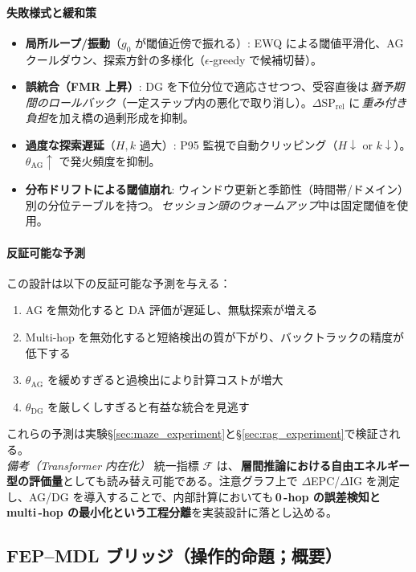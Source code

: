 \documentclass[ja=standard,xelatex]{bxjsarticle}
\newcommand{\F}{\mathcal{F}}
\begin{document}
\paragraph{失敗様式と緩和策}\label{sec:failure_modes}
\begin{itemize}[leftmargin=*]
  \item \textbf{局所ループ/振動}（$g_0$ が閾値近傍で振れる）: EWQ による閾値平滑化、AG クールダウン、探索方針の多様化（$\epsilon$-greedy で候補切替）。
  \item \textbf{誤統合（FMR 上昇）}: DG を下位分位で適応させつつ、受容直後は\,\emph{猶予期間のロールバック}（一定ステップ内の悪化で取り消し）。$\Delta\mathrm{SP}_{\mathrm{rel}}$ に\,\emph{重み付き負担}を加え橋の過剰形成を抑制。
  \item \textbf{過度な探索遅延}（$H, k$ 過大）: P95 監視で自動クリッピング（$H\downarrow$ or $k\downarrow$）。$\theta_{\mathrm{AG}}\uparrow$ で発火頻度を抑制。
  \item \textbf{分布ドリフトによる閾値崩れ}: ウィンドウ更新と季節性（時間帯/ドメイン）別の分位テーブルを持つ。\,\emph{セッション頭のウォームアップ}中は固定閾値を使用。
\end{itemize}

\paragraph{反証可能な予測}
この設計は以下の反証可能な予測を与える：
\begin{enumerate}
  \item AG を無効化すると DA 評価が遅延し、無駄探索が増える
  \item Multi-hop を無効化すると短絡検出の質が下がり、バックトラックの精度が低下する
  \item $\theta_{\mathrm{AG}}$ を緩めすぎると過検出により計算コストが増大
  \item $\theta_{\mathrm{DG}}$ を厳しくしすぎると有益な統合を見逃す
\end{enumerate}

これらの予測は実験\S\ref{sec:maze_experiment}と\S\ref{sec:rag_experiment}で検証される。
\\[0.2em]
\noindent\textit{備考（Transformer 内在化）}\; 統一指標 $\F$ は、\,\textbf{層間推論における自由エネルギー型の評価量}としても読み替え可能である。注意グラフ上で $\Delta$EPC/$\Delta$IG を測定し、AG/DG を導入することで、内部計算においても\,\textbf{0\,\mbox{-}hop の誤差検知と multi\,\mbox{-}hop の最小化という工程分離}を実装設計に落とし込める。

\subsection{FEP–MDL ブリッジ（操作的命題；概要）}
\end{document}
